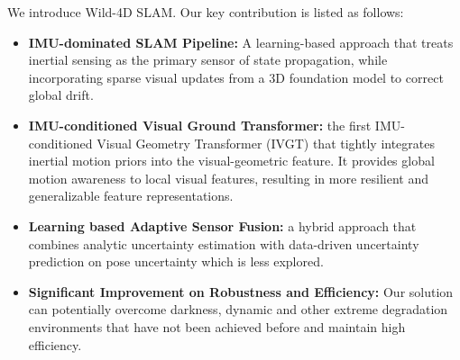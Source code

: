 We introduce Wild-4D SLAM. Our key contribution is listed as follows:
\begin{itemize}
    \item \textbf{IMU-dominated SLAM Pipeline:}
    A learning-based approach that treats inertial sensing as the primary sensor of state propagation, while incorporating sparse visual updates from a 3D foundation model to correct global drift.
    \item \textbf{IMU-conditioned Visual Ground Transformer:} the first IMU-conditioned Visual Geometry Transformer (IVGT) that tightly integrates inertial motion priors into the visual-geometric feature. It provides global motion awareness to local visual features, resulting in more resilient and generalizable feature representations.
    \item \textbf{Learning based Adaptive Sensor Fusion:} a hybrid approach that combines analytic uncertainty estimation with data-driven uncertainty prediction on pose uncertainty which is less explored.
    \item \textbf{Significant Improvement on Robustness and Efficiency:} Our solution can potentially overcome darkness, dynamic and other extreme degradation environments that have not been achieved before and maintain high efficiency.
\end{itemize}















